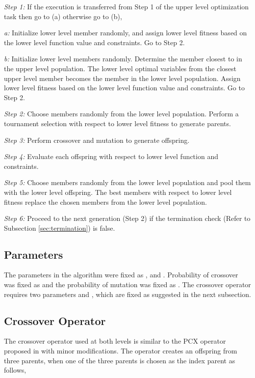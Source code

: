 \documentclass[twoside]{article}
\begin{document}
\textit{}
\vspace{-7mm}

\textit{Step 1:} If the execution is transferred from Step 1 of the upper level optimization task then go to (a) otherwise go to (b),

\quad \textit{a:} Initialize  lower level member randomly, and assign lower level fitness based on the lower level function value and constraints. Go to Step 2.

\quad \textit{b:} Initialize  lower level members randomly. Determine the member closest to  in the upper level population. The lower level optimal variables from the closest upper level member becomes the  member in the lower level population. Assign lower level fitness based on the lower level function value and constraints. Go to Step 2.

\textit{Step 2:} Choose  members randomly from the lower level population. Perform a tournament selection with respect to lower level fitness to generate  parents. 

\textit{Step 3:} Perform crossover and mutation to generate  offspring.

\textit{Step 4:} Evaluate each offspring with respect to lower level function and constraints.

\textit{Step 5:} Choose  members randomly from the lower level population and pool them with the  lower level offspring. The best  members with respect to lower level fitness replace the chosen  members from the lower level population.

\textit{Step 6:} Proceed to the next generation (Step 2) if the termination check (Refer to Subsection \ref{sec:termination}) is false.

\subsection{Parameters}
The parameters in the algorithm were fixed as ,  and . Probability of crossover was fixed as  and the probability of mutation was fixed as . The crossover operator requires two parameters  and , which are fixed as suggested in the next subsection.

\subsection{Crossover Operator}
\label{sec:crossover}
The crossover operator used at both levels is similar to the PCX operator proposed in \cite{my-cec06} with minor modifications. The operator creates an offspring from three parents, when one of the three parents is chosen as the index parent as follows,
\end{document}
